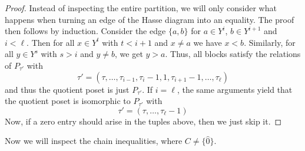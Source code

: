 \documentclass[12pt,a4paper]{amsart}
\theoremstyle{definition}
\begin{document}
\begin{proof}
    Instead of inspecting the entire partition, we will only consider what happens when turning an edge of the Hasse diagram into an equality. 
    The proof then follows by induction.
    Consider the edge $\{a,b\}$ for $a\in Y^{{i}}$, $b\in Y^{{i+1}}$ and $i< \ell$. Then for all $x\in Y^{{t}}$ with $t<i+1$ and $x\neq a$ we have $x<b$.
    Similarly, for all $y\in Y^{{s}}$ with $s>i$ and $y\neq b$, we get $y>a$.
    Thus, all blocks satisfy the relations of $P_{\tau'}$ with
    \begin{equation*}
    \tau'=(\tau,\dots, \tau_{i-1},\tau_{i}-1,1,\tau_{i+1}-1,\dots,\tau_{\ell})
    \end{equation*}
    and thus the quotient poset is just $P_{\tau'}$.
    If $i=\ell$, the same arguments yield that the quotient poset is isomorphic to $P_{\tau'}$ with
    \begin{equation*}
    \tau'=(\tau,\dots, \tau_{\ell}-1)
    \end{equation*}
    Now, if a zero entry should arise in the tuples above, then we just skip it.
\end{proof}

Now we will inspect the chain inequalities, where $C\neq\{\hat{0}\}$.
\end{document}
